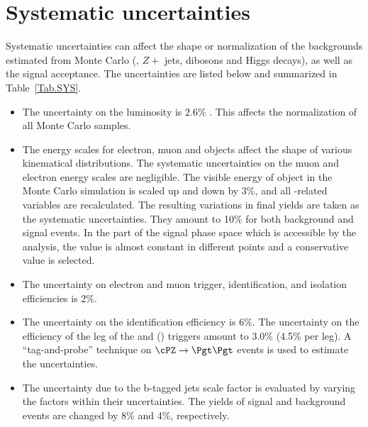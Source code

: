 \section{Systematic uncertainties}
\label{sect:sys}
Systematic uncertainties can affect the shape or normalization of the
backgrounds estimated from Monte Carlo (\ttbar, $Z+$ jets, dibosons and Higgs decays), 
as well as the signal acceptance. 
The uncertainties are listed below and summarized in Table~\ref{Tab.SYS}.


\begin{itemize}

\item The uncertainty on the luminosity  is $2.6\%$ \cite{CMS-PAS-LUM-13-001}.  This affects the
  normalization of all Monte Carlo samples.
 
\item  The energy scales for electron, muon and \Tau objects affect the shape of various kinematical distributions.
 The systematic uncertainties on the muon and electron energy scales are negligible.
The visible energy of \Tau object in the Monte Carlo simulation is scaled up and down
by 3\%, and all \Tau-related variables are recalculated. The resulting variations in
final yields are taken as the systematic uncertainties. They amount to 10\% for both
background and signal events. In the part of the signal phase space which is accessible by
the analysis, the value is almost constant in different points and a conservative value
is selected.


\item The uncertainty on electron and muon trigger, identification, and
  isolation efficiencies is 2\%.

\item The uncertainty on the \Tau identification efficiency is 6\%. 
  The uncertainty on the efficiency of the \Tau leg of the \eTau and
  \muTau (\tauTau) triggers amount to 3.0\% (4.5\% per leg).
  A ``tag-and-probe'' technique on $\cPZ\to \Pgt\Pgt$ events is used to estimate the 
  uncertainties.

\item The uncertainty due to the b-tagged jets scale factor is evaluated by varying the 
factors within their uncertainties. The yields of signal and background events are changed by 8\% 
and 4\%, respectively.
 

\end{itemize}

